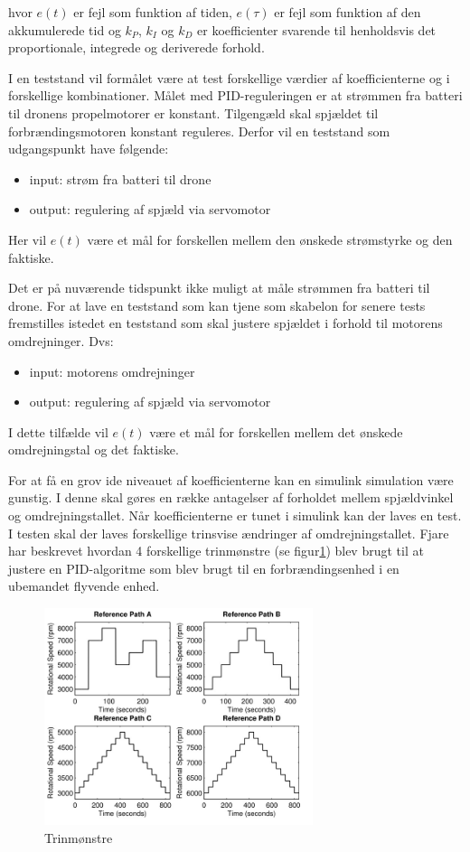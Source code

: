 hvor $e(t)$ er fejl som funktion af tiden, $e(\tau)$ er fejl som funktion af den akkumulerede tid og $k_P$, $k_I$ og $k_D$ er koefficienter svarende til henholdsvis det proportionale, integrede og deriverede forhold.

I en teststand vil formålet være at test forskellige værdier af koefficienterne og i forskellige kombinationer. Målet med PID-reguleringen er at strømmen fra batteri til dronens propelmotorer er konstant. Tilgengæld skal spjældet til forbrændingsmotoren konstant reguleres. Derfor vil en teststand som udgangspunkt have følgende:
\begin{itemize}
\item input: strøm fra batteri til drone
\item output: regulering af spjæld via servomotor
\end{itemize}

Her vil $e(t)$ være et mål for forskellen mellem den ønskede strømstyrke og den faktiske.

Det er på nuværende tidspunkt ikke muligt at måle strømmen fra batteri til drone. For at lave en teststand som kan tjene som skabelon for senere tests fremstilles istedet en teststand som skal justere spjældet i forhold til motorens omdrejninger. Dvs:

\begin{itemize}
\item input: motorens omdrejninger
\item output: regulering af spjæld via servomotor
\end{itemize}

I dette tilfælde vil $e(t)$ være et mål for forskellen mellem det ønskede omdrejningstal og det faktiske.

For at få en grov ide niveauet af koefficienterne kan en simulink simulation være gunstig. I denne skal gøres en række antagelser af forholdet mellem spjældvinkel og omdrejningstallet. Når koefficienterne er tunet i simulink kan der laves en test.
\clearpage
I testen skal der laves forskellige trinsvise ændringer af omdrejningstallet. Fjare\autocite{pid1} har beskrevet hvordan 4 forskellige trinmønstre (se figur\ref{fig:paths}) blev brugt til at justere en PID-algoritme som blev brugt til en forbrændingsenhed i en ubemandet flyvende enhed.

\begin{figure}[h]
  \centering
  \includegraphics[width=0.7\textwidth]{refpaths.JPG}
  \caption{Trinmønstre}
  \label{fig:paths}
\end{figure}

